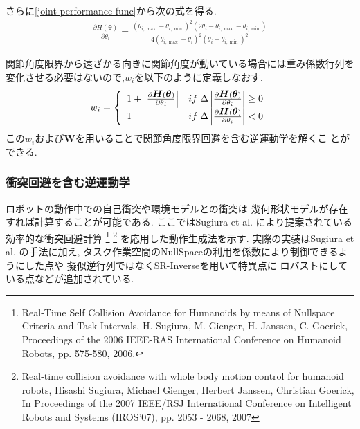 さらに\eqref{joint-performance-func}から次の式を得る.
\begin{eqnarray}
 \frac{\partial H(\bm{\theta})}{\partial \theta_i}
  = \frac{(\theta_{i,\max} - \theta_{i,\min})^2(2\theta_i -
  \theta_{i,\max} - \theta_{i,\min})}
  {4(\theta_{i,\max} - \theta_i)^2(\theta_i - \theta_{i,\min})^2}
\end{eqnarray}

関節角度限界から遠ざかる向きに関節角度が動いている場合には重み係数行列を
変化させる必要はないので,$w_i$を以下のように定義しなおす.
\begin{eqnarray}
 w_i =
  \left\{
   \begin{array}{l l}
   1 + \left|\frac{\partial \mbox{\boldmath{$H$}}(\mbox{\boldmath{$\theta$}})}{\partial \theta_i}\right|
    & if \;\Delta\left|\frac{\partial \mbox{\boldmath{$H$}}(\mbox{\boldmath{$\theta$}})}{\partial
          \theta_i}\right| \geq 0 \\
    1 & if \;\Delta\left|\frac{\partial \mbox{\boldmath{$H$}}(\mbox{\boldmath{$\theta$}})}{\partial
          \theta_i}\right| < 0
    \end{array}
  \right.
\end{eqnarray}
この$w_i$および$\bm{W}$を用いることで関節角度限界回避を含む逆運動学を解くこ
とができる.

\subsubsection{衝突回避を含む逆運動学}
ロボットの動作中での自己衝突や環境モデルとの衝突は
幾何形状モデルが存在すれば計算することが可能である.
ここではSugiura et al. により提案されている効率的な衝突回避計算
\footnote{
Real-Time Self Collision Avoidance for Humanoids by means of
Nullspace Criteria and Task Intervals, 
H. Sugiura, M. Gienger, H. Janssen, C. Goerick,
Proceedings of the 2006 IEEE-RAS International Conference on Humanoid Robots,
pp. 575-580, 2006.
}
\footnote{
\label{WholebodyCollisionAvoidance:Sugiura:IROS07}
Real-time collision avoidance with whole body motion control for
humanoid robots,
Hisashi Sugiura, Michael Gienger, Herbert Janssen, Christian Goerick,
In Proceedings of the 2007 IEEE/RSJ International Conference on Intelligent Robots and Systems (IROS'07), pp. 2053 - 2068, 2007
}
を応用した動作生成法を示す.
実際の実装はSugiura et al. の手法に加え,
タスク作業空間のNullSpaceの利用を係数により制御できるようにした点や
擬似逆行列ではなくSR-Inverseを用いて特異点に
ロバストにしている点などが追加されている.

